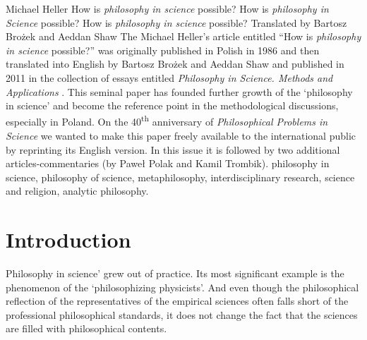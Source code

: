 \begin{artengenv}{Michael Heller}
	{How is \textit{philosophy in science} possible?}
	{How is \textit{philosophy in Science} possible?}
	{How is \textit{philosophy in science} possible?}
	{Translated by Bartosz Brożek and Aeddan Shaw\label{heller-start}}
	{The Michael Heller's article entitled ``How is \textit{philosophy in science} possible?'' was originally published in Polish in 1986
		\parencite[see][]{heller_jakmozliwa_1986} and then translated into English by Bartosz Brożek and Aeddan Shaw and published in 2011 in the collection of essays entitled \textit{Philosophy in Science. Methods and Applications} \parencite{heller_howpossible_2011}. This seminal paper has founded further growth of the `philosophy in science' and become the reference point in the methodological discussions, especially in Poland. On the 40\textsuperscript{th} anniversary of \textit{Philosophical Problems in Science} we wanted to make this paper freely available to the international public by reprinting its English version. In this issue it is followed by two additional articles-commentaries (by Paweł Polak and Kamil Trombik).}
	{philosophy in science, philosophy of science, metaphilosophy, interdisciplinary research, science and religion, analytic philosophy.}



\section{Introduction}






\lettrine[loversize=0.13,lines=2,lraise=-0.05,nindent=0em,findent=0.2pt]%
{P}{}hilosophy in science' grew out of practice.\label{heller-out-of} Its most significant example is the phenomenon of the `philosophizing
physicists'. And even though the philosophical reflection of the representatives of the empirical sciences often falls
short of the professional philosophical standards, it does not change the fact that the sciences are filled with
philosophical contents.

%


\end{artengenv}
